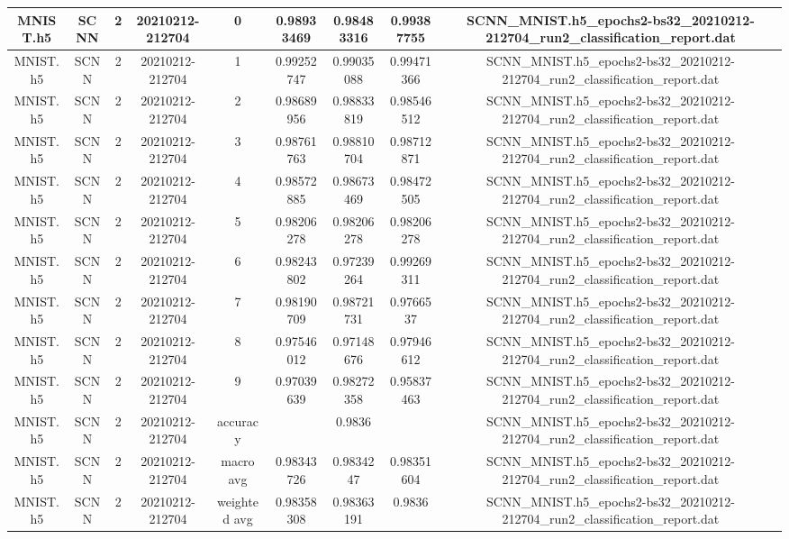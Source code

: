 \documentclass[border=1pt]{standalone}
\begin{document}
\begin{tabular}{|c|c|c|c|c|c|c|c|c|}
        \hline
        MNIST.h5 & SCNN & 2 & 20210212-212704 & 0 & 0.98933469 & 0.98483316 & 0.99387755 & SCNN\_MNIST.h5\_epochs2-bs32\_20210212-212704\_run2\_classification\_report.dat \\
        \hline
        MNIST.h5 & SCNN & 2 & 20210212-212704 & 1 & 0.99252747 & 0.99035088 & 0.99471366 & SCNN\_MNIST.h5\_epochs2-bs32\_20210212-212704\_run2\_classification\_report.dat \\
        \hline
        MNIST.h5 & SCNN & 2 & 20210212-212704 & 2 & 0.98689956 & 0.98833819 & 0.98546512 & SCNN\_MNIST.h5\_epochs2-bs32\_20210212-212704\_run2\_classification\_report.dat \\
        \hline
        MNIST.h5 & SCNN & 2 & 20210212-212704 & 3 & 0.98761763 & 0.98810704 & 0.98712871 & SCNN\_MNIST.h5\_epochs2-bs32\_20210212-212704\_run2\_classification\_report.dat \\
        \hline
        MNIST.h5 & SCNN & 2 & 20210212-212704 & 4 & 0.98572885 & 0.98673469 & 0.98472505 & SCNN\_MNIST.h5\_epochs2-bs32\_20210212-212704\_run2\_classification\_report.dat \\
        \hline
        MNIST.h5 & SCNN & 2 & 20210212-212704 & 5 & 0.98206278 & 0.98206278 & 0.98206278 & SCNN\_MNIST.h5\_epochs2-bs32\_20210212-212704\_run2\_classification\_report.dat \\
        \hline
        MNIST.h5 & SCNN & 2 & 20210212-212704 & 6 & 0.98243802 & 0.97239264 & 0.99269311 & SCNN\_MNIST.h5\_epochs2-bs32\_20210212-212704\_run2\_classification\_report.dat \\
        \hline
        MNIST.h5 & SCNN & 2 & 20210212-212704 & 7 & 0.98190709 & 0.98721731 & 0.9766537 & SCNN\_MNIST.h5\_epochs2-bs32\_20210212-212704\_run2\_classification\_report.dat \\
        \hline
        MNIST.h5 & SCNN & 2 & 20210212-212704 & 8 & 0.97546012 & 0.97148676 & 0.97946612 & SCNN\_MNIST.h5\_epochs2-bs32\_20210212-212704\_run2\_classification\_report.dat \\
        \hline
        MNIST.h5 & SCNN & 2 & 20210212-212704 & 9 & 0.97039639 & 0.98272358 & 0.95837463 & SCNN\_MNIST.h5\_epochs2-bs32\_20210212-212704\_run2\_classification\_report.dat \\
        \hline
        MNIST.h5 & SCNN & 2 & 20210212-212704 & accuracy & \multicolumn{3}{c|}{0.9836} & SCNN\_MNIST.h5\_epochs2-bs32\_20210212-212704\_run2\_classification\_report.dat \\
        \hline
        MNIST.h5 & SCNN & 2 & 20210212-212704 & macro avg & 0.98343726 & 0.9834247 & 0.98351604 & SCNN\_MNIST.h5\_epochs2-bs32\_20210212-212704\_run2\_classification\_report.dat \\
        \hline
        MNIST.h5 & SCNN & 2 & 20210212-212704 & weighted avg & 0.98358308 & 0.98363191 & 0.9836 & SCNN\_MNIST.h5\_epochs2-bs32\_20210212-212704\_run2\_classification\_report.dat \\
        \hline
    \end{tabular}
\end{document}
